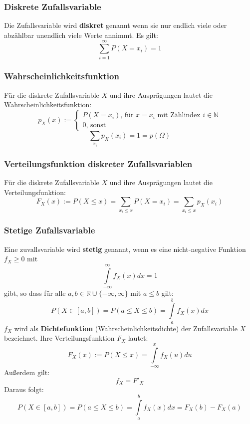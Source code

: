 \documentclass[12pt]{article}
\begin{document}
\subsubsection{Diskrete Zufallsvariable}
Die Zufallsvariable wird \textbf{diskret} genannt wenn sie nur endlich viele oder abzählbar unendlich viele Werte annimmt. Es gilt:
\begin{equation*}
	\sum\limits_{i=1}^\infty P(X=x_i)=1
\end{equation*}
\subsubsection{Wahrscheinlichkeitsfunktion}
Für die diskrete Zufallsvariable $X$ und ihre Ausprägungen lautet die Wahrscheinlichkeitsfunktion:
\begin{equation*}
	p_X(x):=
	\begin{cases}
		P(X=x_i) \text{, für } x = x_i \text{ mit Zählindex } i \in \mathbb{N}\\
		0 \text{, sonst}
	\end{cases}
\end{equation*}
\begin{equation*}
	\sum\limits_{x_i}p_X(x_i)=1=p(\Omega)
\end{equation*}
\subsubsection{Verteilungsfunktion diskreter Zufallsvariablen}
Für die diskrete Zufallsvariable $X$ und ihre Ausprägungen lautet die Verteilungsfunktion:
\begin{equation*}
	F_X(x):=P(X\leq x)=\sum_{x_i\leq x}P(X=x_i)=\sum_{x_i\leq x}p_X(x_i)
\end{equation*}
\subsubsection{Stetige Zufallsvariable}
Eine zuvallsvariable wird \textbf{stetig} genannt, wenn es eine nicht-negative Funktion $f_X\geq 0$ mit 
\begin{equation*}
	\int\limits_{-\infty}^\infty f_X(x) dx = 1
\end{equation*}
gibt, so dass für alle $a,b \in \mathbb{R} \cup \{-\infty, \infty\}$ mit $a\leq b$ gilt:
\begin{equation*}
	P(X\in [a,b]) = P(a\leq X \leq b) = \int\limits_a^b f_X(x)dx
\end{equation*}
$f_X$ wird als \textbf{Dichtefunktion} (Wahrscheinlichkeitsdichte) der Zufallsvariable $X$ bezeichnet.
Ihre Verteilungsfunktion $F_X$ lautet:
\begin{equation*}
	F_X(x):=P(X\leq x) = \int\limits_{-\infty}^x f_X(u)du
\end{equation*}
Außerdem gilt:
\begin{equation*}
	f_X = F'_X
\end{equation*}
Daraus folgt:
\begin{equation*}
	P(X\in [a,b]) = P(a\leq X \leq b) = \int\limits_a^b f_X(x)dx = F_X(b) - F_X(a)
\end{equation*}
\end{document}

